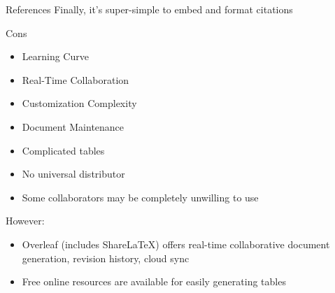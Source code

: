 \documentclass{beamer}
\begin{document}
    

\begin{frame}{References}\label{slide:references}
Finally, it's super-simple to embed and format citations \cite{latexcompanion}
\begin{example}
    
    
\end{example}
\end{frame}

\begin{frame}{Cons}
    \begin{itemize}
        \item Learning Curve
        \item Real-Time Collaboration
        \item Customization Complexity
        \item Document Maintenance
        \item Complicated tables
        \item No universal distributor
        \item Some collaborators may be completely unwilling to use
    \end{itemize}

    \vspace{0.2in}
    
    However:\\
    \begin{itemize}
    \item Overleaf (includes ShareLaTeX) offers real-time collaborative document generation, revision history, cloud sync
    \item Free online resources are available for easily generating tables
    \end{itemize}
\end{frame}
\end{document}
